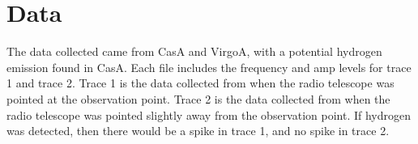 \section{Data}

The data collected came from CasA and VirgoA, with a potential hydrogen emission found in CasA.
Each file includes the frequency and amp levels for trace 1 and trace 2.
Trace 1 is the data collected from when the radio telescope was pointed at the observation point.
Trace 2 is the data collected from when the radio telescope was pointed slightly away from the observation point.
If hydrogen was detected, then there would be a spike in trace 1, and no spike in trace 2.

